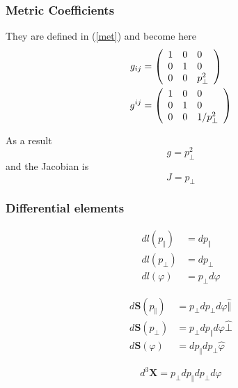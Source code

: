 \subsubsection{Metric Coefficients}

They are defined in (\ref{met}) and become here 
\begin{align}
g_{ij} & =\left( 
\begin{array}{lll}
1 & 0 & 0 \\ 
0 & 1 & 0 \\ 
0 & 0 & p_{\bot}^{2}%
\end{array}
\right) \\
g^{ij} & =\left( 
\begin{array}{lll}
1 & 0 & 0 \\ 
0 & 1 & 0 \\ 
0 & 0 & 1/p_{\bot}^{2}%
\end{array}
\right)  \notag
\end{align}

As a result 
\begin{equation}
g=p_{\bot}^{2}
\end{equation}
and the Jacobian is 
\begin{equation}
J=p_{\bot}
\end{equation}

\subsubsection{Differential elements}

\begin{align}
dl\left( p_{\Vert}\right) & =dp_{\Vert} \\
dl\left( p_{\bot}\right) & =dp_{\bot} \\
dl\left( \varphi\right) & =p_{\bot}d\varphi
\end{align}

\begin{align}
d\mathbf{S}\left( p_{\Vert}\right) & =p_{\bot}dp_{\bot}d\varphi\widehat{
\Vert} \\
d\mathbf{S}\left( p_{\bot}\right) & =p_{\bot}dp_{\Vert}d\varphi\widehat{ \bot%
} \\
d\mathbf{S}\left( \varphi\right) & =dp_{\Vert}dp_{\bot}\widehat{\varphi}
\end{align}

\begin{equation}
d^{3}\mathbf{X}=p_{\bot}dp_{\Vert}dp_{\bot}d\varphi
\end{equation}

